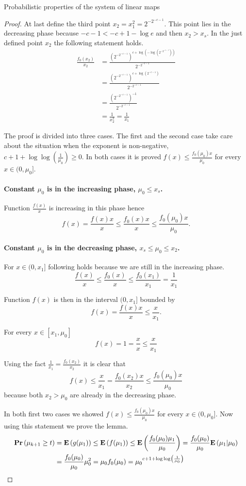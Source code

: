 \begin{section}{Probabilistic properties of the system of linear maps}
\begin{proof}
At last define the third point $x_2 = x_1 ^ 2 = 2 ^ {-2 ^ {-c - 1}}$. This point lies in the decreasing phase because $-c - 1 < -c + 1 - \log e$ and then $x_2 > x_s$. In the just defined point $x_2$ the following statement holds.
\[
\begin{split}
\frac{f_0(x_2)}{x_2} 
	& = \frac{\left(2 ^ {-2 ^ {-c - 1}}\right) ^ {c + \log \left(- \log \left(2 ^ {-2 ^ {-c - 1}}\right)\right)}}{2 ^ {-2 ^ {-c - 1}}} \\
	& = \frac{\left(2 ^ {-2 ^ {-c - 1}}\right) ^ {c + \log \left(2 ^ {-c - 1}\right)}}{2 ^ {-2 ^ {-c - 1}}} \\
	& = \frac{\left(2 ^ {-2 ^ {-c - 1}}\right) ^ {-1}}{2 ^ {-2 ^ {-c - 1}}} \\
	& = \frac{1}{x_2^2} = \frac{1}{x_1}
\end{split}
\]

The proof is divided into three cases. The first and the second case take care about the situation when the exponent is non-negative, $c + 1 + \log \log \left(\frac{1}{\mu_0}\right) \geq 0$. In both cases it is proved $f(x) \leq \frac{f_0(\mu_0)x}{\mu_0}$ for every $x \in (0, \mu_0]$.
\paragraph{Constant $\mu_0$ is in the increasing phase, $\mu_0 \leq x_s$.}
Function $\frac{f(x)}{x}$ is increasing in this phase hence
\[
f(x) = \frac{f(x)x}{x} \leq \frac{f_0(x)x}{x} \leq \frac{f_0(\mu_0)x}{\mu_0} \text{.}
\]

\paragraph{Constant $\mu_0$ is in the decreasing phase, $x_s \leq \mu_0 \leq x_2$.}
For $x \in (0, x_1]$ following holds because we are still in the increasing phase.
\[
\frac{f(x)}{x} \leq \frac{f_0(x)}{x} \leq \frac{f_0(x_1)}{x_1} = \frac{1}{x_1}
\]

Function $f(x)$ is then in the interval $(0, x_1]$ bounded by \[f(x) = \frac{f(x)x}{x} \leq \frac{x}{x_1} \text{.} \]

For every $x \in [x_1, \mu_0]$ 
\[ 
	f(x) = 1 = \frac{x}{x} \leq \frac{x}{x_1}
\]

Using the fact $\frac{1}{x_1} = \frac{f_0(x_2)}{x_2}$ it is clear that 
\[
	f(x) \leq \frac{x}{x_1} = \frac{f_0(x_2)x}{x_2} \leq \frac{f_0(\mu_0)x}{\mu_0}
\]
because both $x_2 > \mu_0$ are already in the decreasing phase.

In both first two cases we showed $f(x) \leq \frac{f_0(\mu_0)x}{\mu_0}$ for every $x \in (0, \mu_0]$. Now using this statement we prove the lemma.
\[
\begin{split}
\mathbf{Pr}\left(\mu_{k + 1} \geq t\right)
	& = \mathbf{E}\left(g(\mu_1)\right) \leq \mathbf{E}\left(f(\mu_1)\right) \leq \mathbf{E}\left(\frac{f_0(\mu_0)\mu_1}{\mu_0}\right) = \frac{f_0(\mu_0)}{\mu_0}\mathbf{E}\left(\mu_1|\mu_0\right) \\
	& = \frac{f_0(\mu_0)}{\mu_0}\mu_0 ^ 2 = \mu_0 f_0(\mu_0) = {\mu_0}^{c + 1 + \log \log \left(\frac{1}{\mu_0}\right)}
\end{split}
\]


\end{proof}
\end{section}
